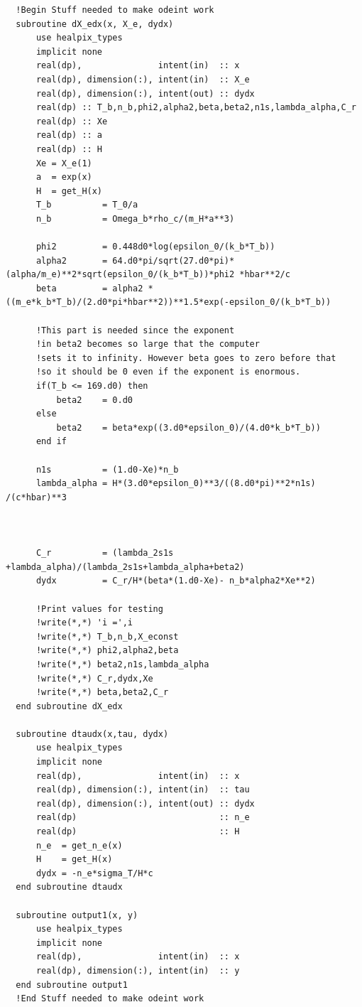 \documentclass{aa}   %
\begin{document}
\begin{verbatim}
  !Begin Stuff needed to make odeint work
  subroutine dX_edx(x, X_e, dydx) 
      use healpix_types
      implicit none
      real(dp),               intent(in)  :: x
      real(dp), dimension(:), intent(in)  :: X_e
      real(dp), dimension(:), intent(out) :: dydx
      real(dp) :: T_b,n_b,phi2,alpha2,beta,beta2,n1s,lambda_alpha,C_r
      real(dp) :: Xe
      real(dp) :: a
      real(dp) :: H 
      Xe = X_e(1)
      a  = exp(x)
      H  = get_H(x)
      T_b          = T_0/a
      n_b          = Omega_b*rho_c/(m_H*a**3)

      phi2         = 0.448d0*log(epsilon_0/(k_b*T_b))
      alpha2       = 64.d0*pi/sqrt(27.d0*pi)*(alpha/m_e)**2*sqrt(epsilon_0/(k_b*T_b))*phi2 *hbar**2/c
      beta         = alpha2 *((m_e*k_b*T_b)/(2.d0*pi*hbar**2))**1.5*exp(-epsilon_0/(k_b*T_b))

      !This part is needed since the exponent
      !in beta2 becomes so large that the computer 
      !sets it to infinity. However beta goes to zero before that 
      !so it should be 0 even if the exponent is enormous.
      if(T_b <= 169.d0) then
          beta2    = 0.d0
      else
          beta2    = beta*exp((3.d0*epsilon_0)/(4.d0*k_b*T_b))
      end if

      n1s          = (1.d0-Xe)*n_b
      lambda_alpha = H*(3.d0*epsilon_0)**3/((8.d0*pi)**2*n1s) /(c*hbar)**3
  


      C_r          = (lambda_2s1s +lambda_alpha)/(lambda_2s1s+lambda_alpha+beta2)
      dydx         = C_r/H*(beta*(1.d0-Xe)- n_b*alpha2*Xe**2)

      !Print values for testing
      !write(*,*) 'i =',i
      !write(*,*) T_b,n_b,X_econst
      !write(*,*) phi2,alpha2,beta
      !write(*,*) beta2,n1s,lambda_alpha
      !write(*,*) C_r,dydx,Xe    
      !write(*,*) beta,beta2,C_r
  end subroutine dX_edx

  subroutine dtaudx(x,tau, dydx) 
      use healpix_types
      implicit none
      real(dp),               intent(in)  :: x
      real(dp), dimension(:), intent(in)  :: tau
      real(dp), dimension(:), intent(out) :: dydx
      real(dp)                            :: n_e
      real(dp)                            :: H
      n_e  = get_n_e(x)
      H    = get_H(x)
      dydx = -n_e*sigma_T/H*c
  end subroutine dtaudx

  subroutine output1(x, y)
      use healpix_types
      implicit none
      real(dp),               intent(in)  :: x
      real(dp), dimension(:), intent(in)  :: y
  end subroutine output1
  !End Stuff needed to make odeint work



\end{verbatim}
\end{document}
